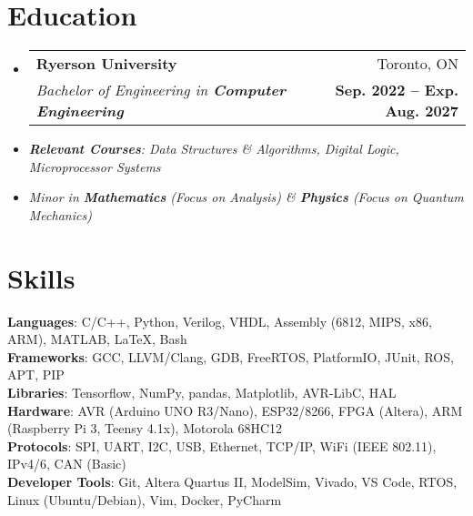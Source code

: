 \documentclass[letterpaper,11pt]{article}
\makeatletter
\newcommand{\resumeItem}[1]{
  \item\small{
    {#1 \vspace{-2pt}}
  }
}
\newcommand{\spaceReducer}{ %
    \vspace{-0.5cm}
}
\newcommand{\spaceReducerMini}{ %
    \vspace{-0.25cm}
}
\newcommand{\resumeSubheading}[4]{
  \vspace{-2pt}\item
    \begin{tabular*}{0.97\textwidth}[t]{l@{\extracolsep{\fill}}r}
      \textbf{#1} & #2 \\
      \textit{\small#3} & {\small#4} \\ %
    \end{tabular*}\vspace{-7pt}
}
\newcommand{\resumeSubHeadingListStart}{\begin{itemize}[leftmargin=0.15in, label={}]}
\newcommand{\resumeSubHeadingListEnd}{\end{itemize}}
\makeatother
\begin{document}
\section{Education}
  \resumeSubHeadingListStart
    \resumeSubheading
      {Ryerson University}{Toronto, ON}
      {Bachelor of Engineering in \textbf{Computer Engineering}}{\textbf{Sep. 2022 -- Exp. Aug. 2027}}
      \vspace{0.05cm}
      \resumeItem{\hspace{0.5cm}\textit{\textbf{Relevant Courses}: Data Structures \& Algorithms, Digital Logic, Microprocessor Systems}}
      \resumeItem{\textit{Minor in \textbf{Mathematics} (Focus on Analysis) \& \textbf{Physics} (Focus on Quantum Mechanics)}}
    \spaceReducerMini
  \resumeSubHeadingListEnd

\section{Skills}
 \begin{itemize}[leftmargin=0.15in, label={}]
    \small{\item{
     \textbf{Languages}{: C/C++, Python, Verilog, VHDL, Assembly (6812, MIPS, x86, ARM), MATLAB, LaTeX, Bash} \\
     \textbf{Frameworks}{: GCC, LLVM/Clang, GDB, FreeRTOS, PlatformIO, JUnit, ROS, APT, PIP} \\
     \textbf{Libraries}{: Tensorflow, NumPy, pandas, Matplotlib, AVR-LibC, HAL} \\
     \textbf{Hardware}{: AVR (Arduino UNO R3/Nano), ESP32/8266, FPGA (Altera), ARM (Raspberry Pi 3, Teensy 4.1x), Motorola 68HC12} \\
     \textbf{Protocols}{: SPI, UART, I2C, USB, Ethernet, TCP/IP, WiFi (IEEE 802.11), IPv4/6, CAN (Basic)} \\
     \textbf{Developer Tools}{: Git, Altera Quartus II, ModelSim, Vivado, VS Code, RTOS, Linux (Ubuntu/Debian), Vim, Docker, PyCharm} \\
    }}
    \spaceReducerMini
 \end{itemize}
\end{document}
